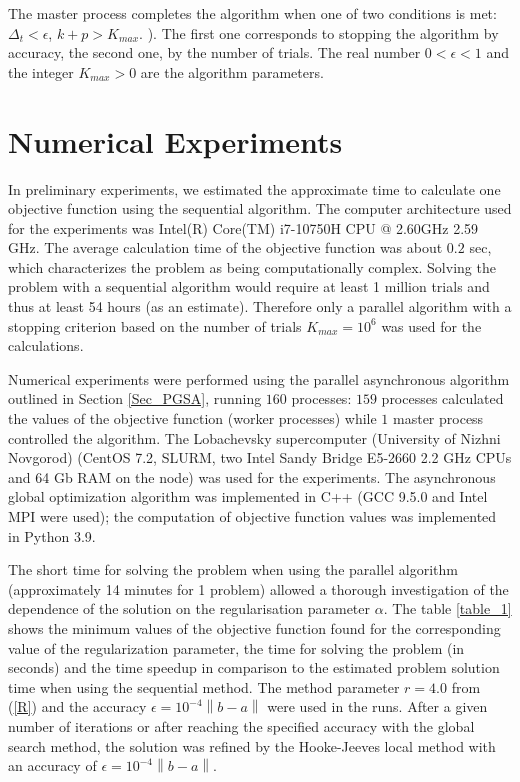 \documentclass{svproc}
\begin{document}
The master process completes the algorithm when one of two conditions is met: $\Delta_{t}<\epsilon$, $k+p>K_{max}$.
). The first one corresponds to stopping the algorithm by accuracy, the second one, by the number of trials. The real number $0<\epsilon<1$ and the integer $K_{max}>0$ are the algorithm parameters.

\section{Numerical Experiments}\label{Sec_Exp}

In preliminary experiments, we estimated the approximate time to calculate one objective function using the sequential algorithm. The computer architecture used for the experiments was Intel(R) Core(TM) i7-10750H CPU @ 2.60GHz 2.59 GHz. The average calculation time of the objective function was about $0.2$ sec, which characterizes the problem as being computationally complex.  Solving the problem with a sequential algorithm would require at least 1 million trials and thus at least 54 hours (as an estimate). Therefore only a parallel algorithm with a stopping criterion based on the number of trials $K_{max}=10^6$ was used for the calculations. 

Numerical experiments were performed using the parallel asynchronous algorithm outlined in Section \ref{Sec_PGSA}, running $160$ processes: $159$ processes calculated the values of the objective function (worker processes) while $1$ master process controlled the algorithm. The Lobachevsky  supercomputer (University of Nizhni Novgorod)  (CentOS 7.2, SLURM, two Intel Sandy Bridge E5-2660 2.2 GHz CPUs and 64 Gb RAM on the node) was used for the experiments. The asynchronous global optimization algorithm was implemented in C++ (GCC 9.5.0 and Intel MPI were used); the computation of objective function values was implemented in Python 3.9.

The short time for solving the problem when using the parallel algorithm (approximately 14 minutes for 1 problem) allowed a thorough investigation of the dependence of the solution on the regularisation parameter $\alpha$. The table \ref{table_1} shows the minimum values of the objective function found for the corresponding value of the regularization parameter, the time for solving the problem (in seconds) and the time speedup in comparison to the estimated problem solution time when using the sequential method. The method parameter $r=4.0$ from (\ref{R}) and the accuracy $\epsilon = 10^{-4}\left\|b-a\right\|$ were used in the runs. After a given number of iterations or after reaching the specified accuracy with the global search method, the solution was refined by the Hooke-Jeeves local method \cite{HookJeeves} with an accuracy of $\epsilon = 10^{-4}\left\|b-a\right\|$.
\end{document}
